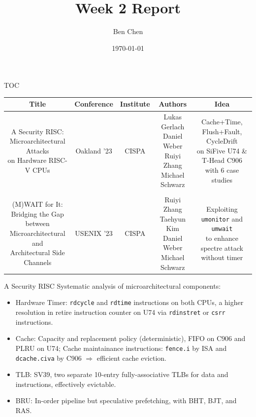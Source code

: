 \documentclass{beamer}
\title{Week 2 Report}
\author{Ben Chen}
\institute{Dept of Computer Science and Engineering, SUSTech}
\date{\today}
\begin{document}
\frame{\titlepage}

\begin{frame}{TOC}
\begin{table}[ht]
    \tiny
	\centering
	\begin{tabular}[c]{ccccc}
		\toprule
        Title & Conference & Institute & Authors & Idea \\
		\midrule
        \makecell{A Security RISC: \\ Microarchitectural Attacks \\ on Hardware RISC-V CPUs} & Oakland '23 & CISPA & \makecell{Lukas Gerlach\\ Daniel Weber\\ Ruiyi Zhang\\ Michael Schwarz}  & \makecell{Cache+Time, Flush+Fault, CycleDrift \\ on SiFive U74 \& T-Head C906 \\ with 6 case studies} \\ \\ 
        \makecell{(M)WAIT for It: \\ Bridging the Gap between \\ Microarchitectural and \\ Architectural Side Channels} & USENIX '23 & CISPA & \makecell{Ruiyi Zhang\\ Taehyun Kim\\ Daniel Weber\\Michael Schwarz} & \makecell{Exploiting \texttt{umonitor} and \texttt{umwait} \\ to enhance spectre attack \\ without timer} \\
		\bottomrule
	\end{tabular}
\end{table}
\end{frame}

\begin{frame}{A Security RISC\cite{a-secure-risc}}
Systematic analysis of microarchitectural components:
\begin{itemize}[<+->]
    \item Hardware Timer: \texttt{rdcycle} and \texttt{rdtime} instructions on both CPUs, a higher resolution in retire instruction counter on U74 via \texttt{rdinstret} or \texttt{csrr} instructions.
    \item Cache: Capacity and replacement policy (deterministic), FIFO on C906 and PLRU on U74; Cache maintainance instructions: \texttt{fence.i} by ISA and \texttt{dcache.civa} by C906 $\Rightarrow$ efficient cache eviction.
    \item TLB: SV39, two separate 10-entry fully-associative TLBs for data and instructions, effectively evictable.
    \item BRU: In-order pipeline but speculative prefetching, with BHT, BJT, and RAS.
\end{itemize}
\end{frame}
\end{document}

